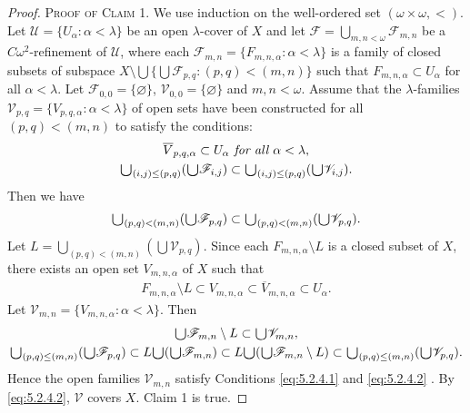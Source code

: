 \documentclass[jisng5i.tex]{subfiles}
\begin{document}
\begin{proof}
\noindent\textsc{Proof of Claim 1}. We use induction on the well-ordered set 
$(\omega \times \omega, <)$. 
Let \(\mathscr{U} = \{ U_\alpha: \alpha < \lambda \}\) be an open \(\lambda\)-cover of \(X\) 
and let \(\mathscr{F} = \bigcup_{m,n<\omega} \mathscr{F}_{m,n}\) be a 
\(C\omega^2\)-refinement of \(\mathscr{U}\), where each 
\(\mathscr{F}_{m,n} = \{ F_{m,n,\alpha}: \alpha < \lambda\}\) is a family 
of closed subsets of  subspace 
\(X \setminus \bigcup\{\bigcup\mathscr{F}_{p,q}: (p, q) <  (m,n)\}\) such that 
\(F_{m,n,\alpha} \subset U_\alpha\) for all \(\alpha < \lambda\).
	Let \(\mathscr{F}_{0,0} = \{\varnothing\}\), 
\(\mathscr{V}_{0,0} = \{\varnothing\}\) and
$m,n < \omega$. 
 Assume that the $\lambda$-families 
 \(\mathscr{V}_{p,q} = \{ V_{p,q,\alpha}: \alpha < \lambda \}\) 
 of open sets  have been constructed for all \((p,q) <  ( m,n)\) to satisfy the conditions:
\begin{gather}
\overline{V}_{p,q,\alpha} \subset U_\alpha \textit{ for all } \alpha < \lambda, \label{eq:5.2.4.1}\\
\raisebox{-2pt}{\scalebox{1.5}{$\cup$}}_{(i, j) \le (p,q)} (\raisebox{-2pt}{\scalebox{1.5}{$\cup$}} \mathscr{F}_{i,j}) \subset
 \raisebox{-2pt}{\scalebox{1.5}{$\cup$}}_{(i, j) \le (p,q)} (\raisebox{-2pt}{\scalebox{1.5}{$\cup$}} \mathscr{V}_{i,j}). \label{eq:5.2.4.2}
\end{gather}
Then we have
\begin{gather}
\raisebox{-2pt}{\scalebox{1.5}{$\cup$}}_{(p,q) < (m,n)} (\raisebox{-2pt}{\scalebox{1.5}{$\cup$}} \mathscr{F}_{p,q}) \subset
\raisebox{-2pt}{\scalebox{1.5}{$\cup$}}_{(p,q) < (m,n)} (\raisebox{-2pt}{\scalebox{1.5}{$\cup$}} \mathscr{V}_{p, q}).  \label{eq:5.2.4.3}
\end{gather}
Let \(L = \bigcup_{(p,q) < (m,n)} (\bigcup \mathscr{V}_{p,q})\). 
Since each \(F_{m,n,\alpha} \setminus L\) is a closed subset of \(X\), there exists an open set \(V_{m,n,\alpha}\) of \(X\) such that
\begin{gather}
	F_{m,n,\alpha} \setminus L \subset V_{m,n,\alpha} \subset 
	\overline{V}_{m,n,\alpha} \subset U_\alpha. \label{eq:5.2.4.4}
\end{gather}
Let \(\mathscr{V}_{m,n} = \{ V_{m,n,\alpha}: \alpha < \lambda \}\).  Then
\begin{gather}
\raisebox{-2pt}{\scalebox{1.5}{$\cup$}} \mathscr{F}_{m,n}\setminus L \subset \raisebox{-2pt}{\scalebox{1.5}{$\cup$}} \mathscr{V}_{m,n},  \label{eq:5.2.4.5}\\
\raisebox{-2pt}{\scalebox{1.5}{$\cup$}}_{(p,q) \le (m,n)} (\raisebox{-2pt}{\scalebox{1.5}{$\cup$}} \mathscr{F}_{p,q}) \subset 
L\raisebox{-2pt}{\scalebox{1.5}{$\cup$}}(\raisebox{-2pt}{\scalebox{1.5}{$\cup$}} \mathscr{F}_{m,n})\subset
L\raisebox{-2pt}{\scalebox{1.5}{$\cup$}}(\raisebox{-2pt}{\scalebox{1.5}{$\cup$}} \mathscr{F}_{m,n}\setminus L)\subset
\raisebox{-2pt}{\scalebox{1.5}{$\cup$}}_{(p,q) \le (m,n)} (\raisebox{-2pt}{\scalebox{1.5}{$\cup$}} \mathscr{V}_{p,q}). \label{eq:5.2.4.6}
\end{gather}
Hence the open families \(\mathscr{V}_{m,n}\) satisfy 
Conditions \eqref{eq:5.2.4.1} and \eqref{eq:5.2.4.2} . 
By \eqref{eq:5.2.4.2}, \(\mathscr{V}\) covers \(X\). Claim 1 is true.
	

\end{proof}
\end{document}
